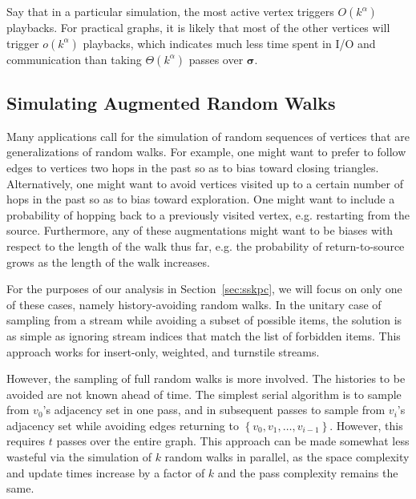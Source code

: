 \documentclass[10]{report}
\begin{document}
Say that in a particular simulation, the most active vertex triggers $O(k^\alpha)$ playbacks.
For practical graphs, it is likely that most of the other vertices will trigger $o(k^\alpha)$ playbacks, which indicates much less time spent in I/O and communication than taking $\Theta(k^\alpha)$ passes over $\boldsymbol{\sigma}$.



\subsection{Simulating Augmented Random Walks}
 \label{walks:sec:walks:augmented}

Many applications call for the simulation of random sequences of vertices that are generalizations of random walks. 
For example, one might want to prefer to follow edges to vertices two hops in the past so as to bias toward closing triangles. 
Alternatively, one might want to avoid vertices visited up to a certain number of hops in the past so as to bias toward exploration. 
One might want to include a probability of hopping back to a previously visited vertex, e.g. restarting from the source. 
Furthermore, any of these augmentations might want to be biases with respect to the length of the walk thus far, e.g. the probability of return-to-source grows as the length of the walk increases.

For the purposes of our analysis in Section~\ref{sec:sskpc}, we will focus on only one of these cases, namely history-avoiding random walks.
In the unitary case of sampling from a stream while avoiding a subset of possible items, the solution is as simple as ignoring stream indices that match the list of forbidden items.
This approach works for insert-only, weighted, and turnstile streams. 

However, the sampling of full random walks is more involved.
The histories to be avoided are not known ahead of time.
The simplest serial algorithm is to sample from $v_0$'s adjacency set in one pass, and in subsequent passes to sample from $v_i$'s adjacency set while avoiding edges returning to $\left \{ v_0, v_1, \dots, v_{i-1} \right \}$. 
However, this requires $t$ passes over the entire graph.
This approach can be made somewhat less wasteful via the simulation of $k$ random walks in parallel, as the space complexity and update times increase by a factor of $k$ and the pass complexity remains the same. 
\end{document}
